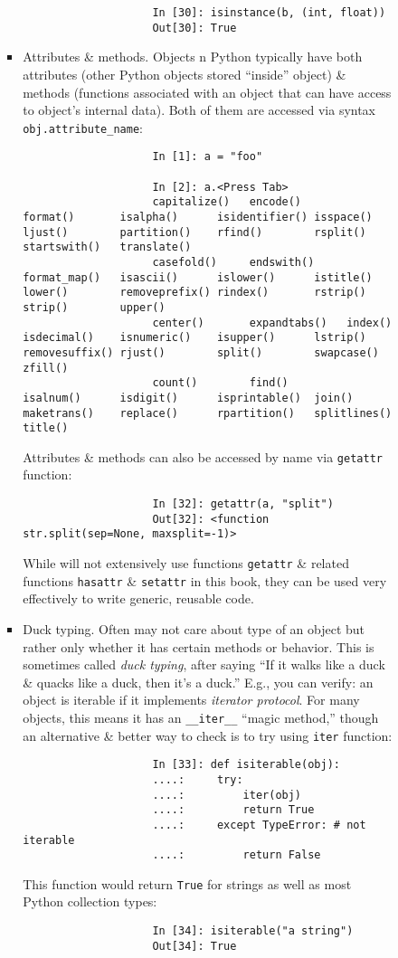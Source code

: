 \documentclass{article}
\begin{document}
\begin{itemize}
\begin{itemize}
\begin{itemize}
\begin{itemize}
\begin{verbatim}
					In [30]: isinstance(b, (int, float))
					Out[30]: True
				\end{verbatim}
				\item {\sf Attributes \& methods.} Objects n Python typically have both attributes (other Python objects stored ``inside'' object) \& methods (functions associated with an object that can have access to object's internal data). Both of them are accessed via syntax \verb|obj.attribute_name|:
				\begin{verbatim}
					In [1]: a = "foo"
					
					In [2]: a.<Press Tab>
					capitalize()   encode()       format()       isalpha()      isidentifier() isspace()      ljust()        partition()    rfind()        rsplit()       startswith()   translate()   
					casefold()     endswith()     format_map()   isascii()      islower()      istitle()      lower()        removeprefix() rindex()       rstrip()       strip()        upper()       
					center()       expandtabs()   index()        isdecimal()    isnumeric()    isupper()      lstrip()       removesuffix() rjust()        split()        swapcase()     zfill()       
					count()        find()         isalnum()      isdigit()      isprintable()  join()         maketrans()    replace()      rpartition()   splitlines()   title()                      
				\end{verbatim}
				Attributes \& methods can also be accessed by name via {\tt getattr} function:
				\begin{verbatim}
					In [32]: getattr(a, "split")
					Out[32]: <function str.split(sep=None, maxsplit=-1)>
				\end{verbatim}
				While will not extensively use functions {\tt getattr} \& related functions {\tt hasattr} \& {\tt setattr} in this book, they can be used very effectively to write generic, reusable code.
				\item {\sf Duck typing.} Often may not care about type of an object but rather only whether it has certain methods or behavior. This is sometimes called {\it duck typing}, after saying ``If it walks like a duck \& quacks like a duck, then it's a duck.'' E.g., you can verify: an object is iterable if it implements {\it iterator protocol}. For many objects, this means it has an \verb|__iter__| ``magic method,'' though an alternative \& better way to check is to try using {\tt iter} function:
				\begin{verbatim}
					In [33]: def isiterable(obj):
					....:     try:
					....:         iter(obj)
					....:         return True
					....:     except TypeError: # not iterable
					....:         return False
				\end{verbatim}
				This function would return {\tt True} for strings as well as most Python collection types:
				\begin{verbatim}
					In [34]: isiterable("a string")
					Out[34]: True
					

\end{verbatim}
\end{itemize}
\end{itemize}
\end{itemize}
\end{itemize}
\end{document}
